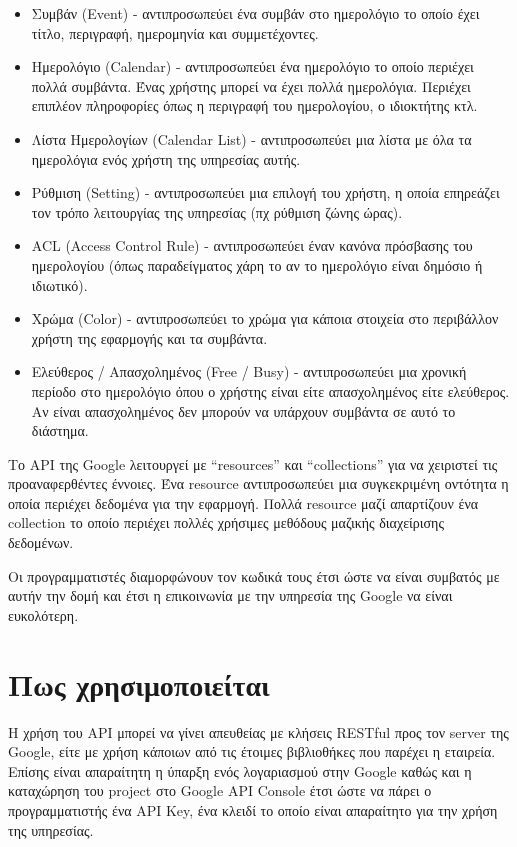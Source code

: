 \begin{itemize}
\item Συμβάν (Event) - αντιπροσωπεύει ένα συμβάν στο ημερολόγιο το οποίο έχει τίτλο, περιγραφή, ημερομηνία και συμμετέχοντες. 

\item Ημερολόγιο (Calendar) - αντιπροσωπεύει ένα ημερολόγιο το οποίο περιέχει πολλά συμβάντα. Ένας χρήστης μπορεί να έχει πολλά ημερολόγια. Περιέχει επιπλέον πληροφορίες όπως η περιγραφή του ημερολογίου, ο ιδιοκτήτης κτλ.

\item Λίστα Ημερολογίων (Calendar List) - αντιπροσωπεύει μια λίστα με όλα τα ημερολόγια ενός χρήστη της υπηρεσίας αυτής.

\item Ρύθμιση (Setting) - αντιπροσωπεύει μια επιλογή του χρήστη, η οποία επηρεάζει τον τρόπο λειτουργίας της υπηρεσίας (πχ ρύθμιση ζώνης ώρας).

\item ACL (Access Control Rule) - αντιπροσωπεύει έναν κανόνα πρόσβασης του ημερολογίου (όπως παραδείγματος χάρη το αν το ημερολόγιο είναι δημόσιο ή ιδιωτικό).

\item Χρώμα (Color) - αντιπροσωπεύει το χρώμα για κάποια στοιχεία στο περιβάλλον χρήστη της εφαρμογής και τα συμβάντα.

\item Ελεύθερος / Απασχολημένος (Free / Busy) - αντιπροσωπεύει μια χρονική περίοδο στο ημερολόγιο όπου ο χρήστης είναι είτε απασχολημένος είτε ελεύθερος. Αν είναι απασχολημένος δεν μπορούν να υπάρχουν συμβάντα 
σε αυτό το διάστημα.
\end{itemize}

Το API της Google λειτουργεί με “resources” και “collections” για να χειριστεί τις προαναφερθέντες έννοιες. Ένα resource αντιπροσωπεύει μια συγκεκριμένη οντότητα η οποία περιέχει δεδομένα για την εφαρμογή. Πολλά resource μαζί απαρτίζουν ένα collection το οποίο περιέχει πολλές χρήσιμες μεθόδους μαζικής διαχείρισης δεδομένων.

Οι προγραμματιστές διαμορφώνουν τον κωδικά τους έτσι ώστε να είναι συμβατός με αυτήν την δομή και έτσι η επικοινωνία με την υπηρεσία της Google να είναι ευκολότερη. 

\section {Πως χρησιμοποιείται}
Η χρήση του API μπορεί να γίνει απευθείας με κλήσεις RESTful προς τον server της Google, είτε με χρήση κάποιων από τις έτοιμες βιβλιοθήκες που παρέχει η εταιρεία. Επίσης είναι απαραίτητη η ύπαρξη ενός λογαριασμού στην Google καθώς και η καταχώρηση του project στο Google API Console έτσι ώστε να πάρει ο προγραμματιστής ένα API Key, ένα κλειδί το οποίο είναι απαραίτητο για την χρήση της υπηρεσίας. 

